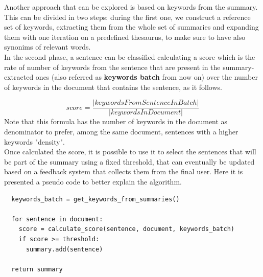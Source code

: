 Another approach that can be explored is based on keywords from the summary. This can be divided in two steps: during the first one, we construct a reference set of keywords, extracting them from the whole set of summaries and expanding them with one iteration on a predefined thesaurus, to make sure to have also synonims of relevant words. \\
In the second phase, a sentence can be classified calculating a score which is the rate of number of keywords from the sentence that are present in the summary-extracted ones (also referred as \textbf{keywords batch} from now on) over the number of keywords in the document that contains the sentence, as it follows.

$$score = \frac{|keywordsFromSentenceInBatch|}{|keywordsInDocument|}$$
Note that this formula has the number of keywords in the document as denominator to prefer, among the same document, sentences with a higher keywords "density".\\
Once calculated the score, it is possible to use it to select the sentences that will be part of the summary using a fixed threshold, that can eventually be updated based on a feedback system that collects them from the final user. 
Here it is presented a pseudo code to better explain the algorithm.

\begin{lstlisting}
  keywords_batch = get_keywords_from_summaries()

  for sentence in document:
    score = calculate_score(sentence, document, keywords_batch)
    if score >= threshold:
      summary.add(sentence)
  
  return summary
  
\end{lstlisting}